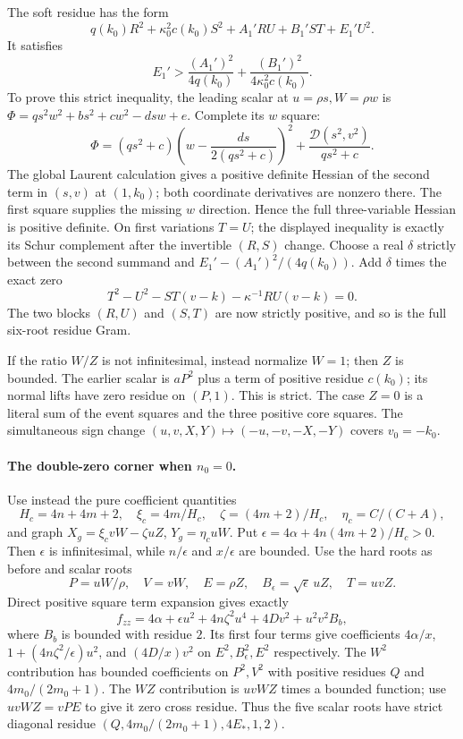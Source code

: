 The soft residue has the form
\[
 q(k_0)R^2+\kappa_0^2c(k_0)S^2+A_1'RU+B_1'ST+E_1'U^2.
\]
It satisfies
\[
 E_1'>\frac{(A_1')^2}{4q(k_0)}+
          \frac{(B_1')^2}{4\kappa_0^2c(k_0)}.
\]
To prove this strict inequality, the leading scalar at
$u=\rho s,W=\rho w$ is
$\Phi=q s^2w^2+b s^2+c w^2-dsw+e$.
Complete its $w$ square:
\[
 \Phi=(qs^2+c)\left(w-\frac{ds}{2(qs^2+c)}\right)^2
           +\frac{\mathcal D(s^2,v^2)}{qs^2+c}.
\]
The global Laurent calculation gives a positive definite Hessian of
the second term in $(s,v)$ at $(1,k_0)$; both coordinate derivatives
are nonzero there.  The first square supplies the missing $w$
direction.  Hence the full three-variable Hessian is positive
definite.  On first variations $T=U$; the displayed inequality is
exactly its Schur complement after the invertible $(R,S)$ change.
Choose a real $\delta$ strictly between the second summand and
$E_1'-(A_1')^2/(4q(k_0))$.  Add $\delta$ times the exact zero
\[
 T^2-U^2-ST(v-k)-\kappa^{-1}RU(v-k)=0.
\]
The two blocks $(R,U)$ and $(S,T)$ are now strictly positive, and so
is the full six-root residue Gram.

If the ratio $W/Z$ is not infinitesimal, instead normalize $W=1$;
then $Z$ is bounded.  The earlier scalar is $aP^2$ plus a term of
positive residue $c(k_0)$; its normal lifts have zero residue on
$(P,1)$.  This is strict.  The case $Z=0$ is a literal sum of the
event squares and the three positive core squares.  The simultaneous
sign change $(u,v,X,Y)\mapsto(-u,-v,-X,-Y)$ covers $v_0=-k_0$.

\paragraph{The double-zero corner when $n_0=0$.}
Use instead the pure coefficient quantities
\[
 H_c=4n+4m+2,\quad \xi_c=4m/H_c,\quad
 \zeta=(4m+2)/H_c,\quad \eta_c=C/(C+A),
\]
and graph $X_g=\xi_cvW-\zeta uZ$, $Y_g=\eta_cuW$.
Put $\epsilon=4\alpha+4n(4m+2)/H_c>0$.
Then $\epsilon$ is infinitesimal, while $n/\epsilon$ and
$x/\epsilon$ are bounded.  Use the hard roots as before and scalar
roots
\[
 P=uW/\rho,\quad V=vW,\quad E=\rho Z,\quad
 B_\epsilon=\sqrt\epsilon\,uZ,\quad T=uvZ.
\]
Direct positive square term expansion gives exactly
\[
 f_{zz}=4\alpha+\epsilon u^2+4n\zeta^2u^4+4Dv^2
                         +u^2v^2 B_b,
\]
where $B_b$ is bounded with residue $2$.  Its first four terms
give coefficients $4\alpha/x$, $1+(4n\zeta^2/\epsilon)u^2$,
and $(4D/x)v^2$ on $E^2,B_\epsilon^2,E^2$ respectively.  The
$W^2$ contribution has bounded coefficients on $P^2,V^2$ with
positive residues $Q$ and $4m_0/(2m_0+1)$.  The $WZ$ contribution
is $uvWZ$ times a bounded function; use $uvWZ=vPE$ to give it zero
cross residue.  Thus the five scalar roots have strict diagonal
residue $(Q,4m_0/(2m_0+1),4E_*,1,2)$.

